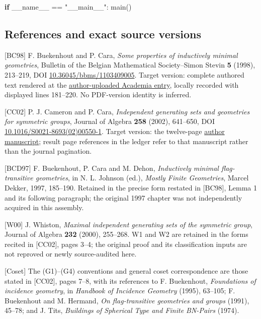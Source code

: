 \documentclass[
  10pt,
  letterpaper,
]{article}
\newenvironment{Shaded}{}{}
\newcommand{\ControlFlowTok}[1]{\textcolor[rgb]{0.00,0.44,0.13}{\textbf{#1}}}
\newcommand{\NormalTok}[1]{#1}
\newcommand{\OperatorTok}[1]{\textcolor[rgb]{0.40,0.40,0.40}{#1}}
\newcommand{\StringTok}[1]{\textcolor[rgb]{0.25,0.44,0.63}{#1}}
\newcommand{\VariableTok}[1]{\textcolor[rgb]{0.10,0.09,0.49}{#1}}
\begin{document}
\begin{Shaded}
\begin{Highlighting}[]
\ControlFlowTok{if} \VariableTok{\_\_name\_\_} \OperatorTok{==} \StringTok{"\_\_main\_\_"}\NormalTok{:}
\NormalTok{    main()}
\end{Highlighting}
\end{Shaded}

\subsection{References and exact source
versions}\label{references-and-exact-source-versions}

{[}BC98{]} F. Buekenhout and P. Cara, \emph{Some properties of
inductively minimal geometries}, Bulletin of the Belgian Mathematical
Society--Simon Stevin \textbf{5} (1998), 213--219, DOI
\href{https://doi.org/10.36045/bbms/1103409005}{10.36045/bbms/1103409005}.
Target version: complete authored text rendered at the
\href{https://www.academia.edu/54639280/Some_properties_of_inductively_minimal_geometries}{author-uploaded
Academia entry}, locally recorded with displayed lines 181--220. No
PDF-version identity is inferred.

{[}CC02{]} P. J. Cameron and P. Cara, \emph{Independent generating sets
and geometries for symmetric groups}, Journal of Algebra \textbf{258}
(2002), 641--650, DOI
\href{https://doi.org/10.1016/S0021-8693(02)00550-1}{10.1016/S0021-8693(02)00550-1}.
Target version: the twelve-page
\href{https://maths.qmul.ac.uk/~pjc/preprints/igsgsn.pdf}{author
manuscript}; result page references in the ledger refer to that
manuscript rather than the journal pagination.

{[}BCD97{]} F. Buekenhout, P. Cara and M. Dehon, \emph{Inductively
minimal flag-transitive geometries}, in N. L. Johnson (ed.),
\emph{Mostly Finite Geometries}, Marcel Dekker, 1997, 185--190. Retained
in the precise form restated in {[}BC98{]}, Lemma 1 and its following
paragraph; the original 1997 chapter was not independently acquired in
this assembly.

{[}W00{]} J. Whiston, \emph{Maximal independent generating sets of the
symmetric group}, Journal of Algebra \textbf{232} (2000), 255--268. W1
and W2 are retained in the forms recited in {[}CC02{]}, pages 3--4; the
original proof and its classification inputs are not reproved or newly
source-audited here.

{[}Coset{]} The (G1)--(G4) conventions and general coset correspondence
are those stated in {[}CC02{]}, pages 7--8, with its references to F.
Buekenhout, \emph{Foundations of incidence geometry}, in \emph{Handbook
of Incidence Geometry} (1995), 63--105; F. Buekenhout and M. Hermand,
\emph{On flag-transitive geometries and groups} (1991), 45--78; and J.
Tits, \emph{Buildings of Spherical Type and Finite BN-Pairs} (1974).
\end{document}
